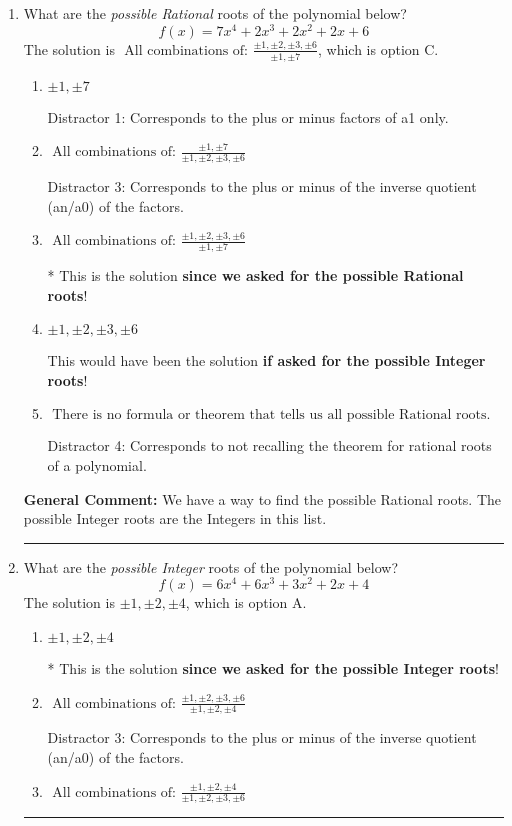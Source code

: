\documentclass{extbook}[14pt]
\newcommand{\litem}[1]{\item #1

\rule{\textwidth}{0.4pt}}
\begin{document}
\begin{enumerate}\litem{
What are the \textit{possible Rational} roots of the polynomial below?
\[ f(x) = 7x^{4} +2 x^{3} +2 x^{2} +2 x + 6 \]The solution is \( \text{ All combinations of: }\frac{\pm 1,\pm 2,\pm 3,\pm 6}{\pm 1,\pm 7} \), which is option C.\begin{enumerate}[label=\Alph*.]
\item \( \pm 1,\pm 7 \)

 Distractor 1: Corresponds to the plus or minus factors of a1 only.
\item \( \text{ All combinations of: }\frac{\pm 1,\pm 7}{\pm 1,\pm 2,\pm 3,\pm 6} \)

 Distractor 3: Corresponds to the plus or minus of the inverse quotient (an/a0) of the factors. 
\item \( \text{ All combinations of: }\frac{\pm 1,\pm 2,\pm 3,\pm 6}{\pm 1,\pm 7} \)

* This is the solution \textbf{since we asked for the possible Rational roots}!
\item \( \pm 1,\pm 2,\pm 3,\pm 6 \)

This would have been the solution \textbf{if asked for the possible Integer roots}!
\item \( \text{ There is no formula or theorem that tells us all possible Rational roots.} \)

 Distractor 4: Corresponds to not recalling the theorem for rational roots of a polynomial.
\end{enumerate}

\textbf{General Comment:} We have a way to find the possible Rational roots. The possible Integer roots are the Integers in this list.
}
\litem{
What are the \textit{possible Integer} roots of the polynomial below?
\[ f(x) = 6x^{4} +6 x^{3} +3 x^{2} +2 x + 4 \]The solution is \( \pm 1,\pm 2,\pm 4 \), which is option A.\begin{enumerate}[label=\Alph*.]
\item \( \pm 1,\pm 2,\pm 4 \)

* This is the solution \textbf{since we asked for the possible Integer roots}!
\item \( \text{ All combinations of: }\frac{\pm 1,\pm 2,\pm 3,\pm 6}{\pm 1,\pm 2,\pm 4} \)

 Distractor 3: Corresponds to the plus or minus of the inverse quotient (an/a0) of the factors. 
\item \( \text{ All combinations of: }\frac{\pm 1,\pm 2,\pm 4}{\pm 1,\pm 2,\pm 3,\pm 6} \)


\end{enumerate}}
\end{enumerate}
\end{document}
